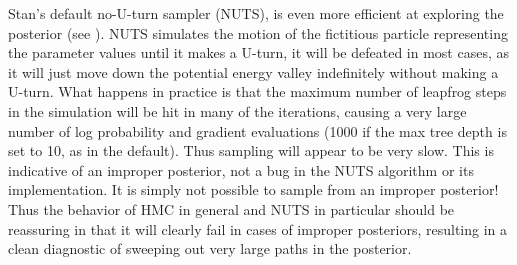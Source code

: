 Stan's default no-U-turn sampler (NUTS), is even more efficient at
exploring the posterior (see
\citep{Hoffman-Gelman:2011,Hoffman-Gelman:2014}).  NUTS simulates the
motion of the fictitious particle representing the parameter values
until it makes a U-turn, it will be defeated in most cases, as it will
just move down the potential energy valley indefinitely without making
a U-turn. What happens in practice is that the maximum number of
leapfrog steps in the simulation will be hit in many of the
iterations, causing a very large number of log probability and
gradient evaluations (1000 if the max tree depth is set to 10, as in
the default). Thus sampling will appear to be very slow.  This is
indicative of an improper posterior, not a bug in the NUTS algorithm
or its implementation.  It is simply not possible to sample from an
improper posterior!  Thus the behavior of HMC in general and NUTS
in particular should be reassuring in that it will clearly fail in
cases of improper posteriors, resulting in a clean diagnostic of
sweeping out very large paths in the posterior.

